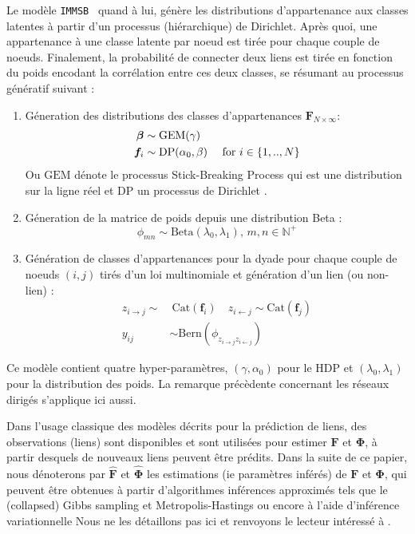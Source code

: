 \documentclass[french]{hermes-journal}
\renewcommand{\text}{\textnormal}
\newcommand{\immsb}{\texttt{IMMSB}}
\newcommand{\gem}{\mathrm{GEM}}
\newcommand{\DP}{\mathrm{DP}}
\newcommand{\mat}[1]{\bm{#1}}
\begin{document}
Le modèle \immsb~ quand à lui, génère les distributions d'appartenance aux classes latentes à partir d'un processus (hiérarchique) de Dirichlet. Après quoi, une appartenance à une classe latente par noeud est tirée pour chaque couple de noeuds. Finalement, la probabilité de connecter deux liens est tirée en fonction du poids encodant la corrélation entre ces deux classes, se résumant au processus génératif suivant :
\begin{enumerate}
\item Géneration des distributions des classes d'appartenances $\mat{F}_{N \times \infty}$:
   \begin{align}
       \bm{\beta} &\sim \gem(\gamma) \nonumber \\
    \mat{f}_i &\sim \DP(\alpha_0, \beta) \quad\text{ for }  i \in \{1, .., N\} \nonumber
   \end{align}  Ou $\gem$ dénote le processus Stick-Breaking Process qui est une distribution sur la ligne réel et $\DP$ un processus de Dirichlet \cite{HDP}.
\item Géneration de la matrice de poids depuis une distribution Beta :\\
\[ \phi_{mn} \sim \mathrm{Beta}(\lambda_0,\lambda_1), \, m,n \in \mathbb{N}^{+} \]
\item Génération de classes d'appartenances pour la dyade pour chaque couple de noeuds $(i,j)$ tirés d'un loi multinomiale et génération d'un lien (ou non-lien) : 
   \begin{align}
       z_{i \rightarrow j} \sim&\ \mbox{Cat}(\mat{f}_i) \quad z_{i \leftarrow j} \sim \mbox{Cat}(\mat{f}_j) \nonumber \\
       y_{ij} &\sim \mathrm{Bern}(\phi_{z_{i \rightarrow j}z_{i \leftarrow j}}) \nonumber
    \label{eq:link-immsb}
   \end{align}
\end{enumerate}


Ce modèle contient quatre hyper-paramètres, $(\gamma, \alpha_0)$ pour le HDP et $(\lambda_0, \lambda_1)$ pour la distribution des poids. La remarque précèdente concernant les réseaux dirigés s'applique ici aussi.

Dans l'usage classique des modèles décrits pour la prédiction de liens, des observations (liens) sont disponibles et sont utilisées pour estimer  $\mat{F}$ et $\mat{\Phi}$, à partir desquels de nouveaux liens peuvent être prédits. Dans la suite de ce papier, nous dénoterons par $\mat{\hat{F}}$ et $\mat{\hat{\Phi}}$ les estimations (ie paramètres inférés) de $\mat{F}$ et $\mat{\Phi}$, qui peuvent être obtenues à partir d'algorithmes inférences approximés tels que le (collapsed) Gibbs sampling et Metropolis-Hastings ou encore à l'aide d'inférence variationnelle Nous ne les détaillons pas ici et renvoyons le lecteur intéressé à \cite{ILFRM,IBP,HDP,fan2015dynamic}.
\end{document}
